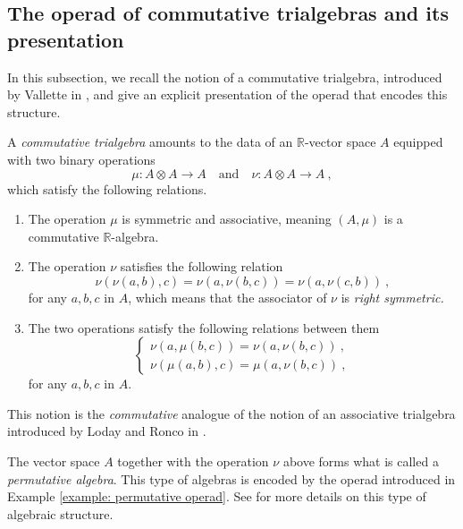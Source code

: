 \documentclass[a4paper,12pt]{amsart}
\begin{document}
\subsection{The operad of commutative trialgebras and its presentation}
In this subsection, we recall the notion of a commutative trialgebra, introduced by Vallette in \cite{Vallettepartition}, and give an explicit presentation of the operad that encodes this structure. 

\begin{definition}\label{def: commutative trialgebra}
A \textit{commutative trialgebra} amounts to the data of an $\mathbb{R}$-vector space $A$ equipped with two binary operations 
\[
\mu: A \otimes A \longrightarrow A \quad \text{and} \quad \nu: A \otimes A \longrightarrow A~,
\]
which satisfy the following relations. 

\begin{enumerate}
\item The operation $\mu$ is symmetric and associative, meaning $(A,\mu)$ is a commutative $\mathbb{R}$-algebra.

\item The operation $\nu$ satisfies the following relation 
\[
\nu(\nu(a,b),c) = \nu(a,\nu(b,c)) = \nu(a,\nu(c,b))~,
\]
for any $a,b,c$ in $A$, which means that the associator of $\nu$ is \textit{right symmetric.}

\item The two operations satisfy the following relations between them
\[ \begin{cases}
\nu(a,\mu(b,c)) = \nu(a,\nu(b,c))~, \\
\nu(\mu(a,b),c) = \mu(a,\nu(b,c))~,
\end{cases} \]
for any $a,b,c$ in $A$. 
\end{enumerate}
\end{definition}

\begin{remark}
This notion is the \textit{commutative} analogue of the notion of an associative trialgebra introduced by Loday and Ronco in \cite{LodayRonco}.  
\end{remark}

\begin{remark}
The vector space $A$ together with the operation $\nu$ above forms what is called a \textit{permutative algebra}. This type of algebras is encoded by the operad introduced in Example \ref{example: permutative operad}. See \cite{Chapoton01} for more details on this type of algebraic structure.
\end{remark}
\end{document}
